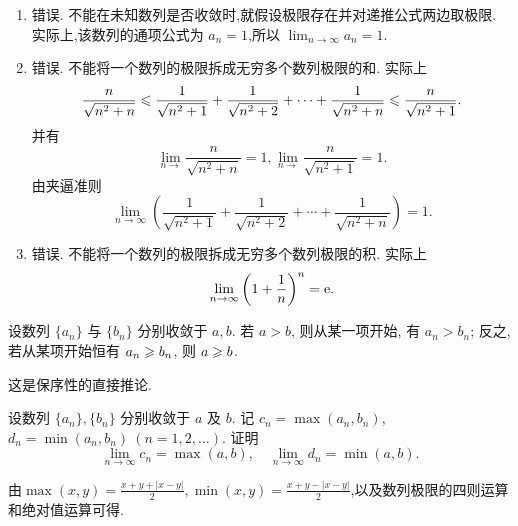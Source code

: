 \begin{solution}
    \begin{enumerate}
        \item 错误. 不能在未知数列是否收敛时,就假设极限存在并对递推公式两边取极限. 实际上,该数列的通项公式为 $a_n = 1$,所以 $\lim_{n\to\infty} a_n = 1$.
        \item 错误. 不能将一个数列的极限拆成无穷多个数列极限的和. 实际上
              $$
                  \frac{n}{\sqrt{n^2+n}}\leqslant \frac{1}{\sqrt{n^2+1}} + \frac{1}{\sqrt{n^2+2}} + \cdots + \frac{1}{\sqrt{n^2+n}}
                  \leqslant  \frac{n}{\sqrt{n^2+1}}.
              $$
              并有$$\lim_{n\to}\frac{n}{\sqrt{n^2+n}}=1,\lim_{n\to}\frac{n}{\sqrt{n^2+1}}=1.
              $$
              由夹逼准则$$
                  \lim_{n\to\infty} \left( \frac{1}{\sqrt{n^2+1}} + \frac{1}{\sqrt{n^2+2}} + \cdots + \frac{1}{\sqrt{n^2+n}} \right) = 1.
              $$
        \item 错误. 不能将一个数列的极限拆成无穷多个数列极限的积. 实际上
              $$
                  \lim_{n\to\infty} \left(1 + \frac{1}{n}\right)^n = \mathrm{e}.
              $$
    \end{enumerate}
\end{solution}

\begin{exercise}[1.2.13]
    设数列 $\{a_n\}$ 与 $\{b_n\}$ 分别收敛于 $a, b$. 若 $a > b$, 则从某一项开始, 有 $a_n > b_n$; 反之, 若从某项开始恒有 $a_n \geqslant b_n$, 则 $a \geqslant b$.
\end{exercise}

\begin{solution}
    这是保序性的直接推论.
\end{solution}

\begin{exercise}[1.2.14]
    设数列 $\{a_n\}, \{b_n\}$ 分别收敛于 $a$ 及 $b$. 记 $c_n = \max(a_n, b_n)$, $d_n = \min(a_n, b_n) \ (n=1, 2, \ldots)$. 证明
    $$
        \lim_{n\to\infty} c_n = \max(a, b), \quad \lim_{n\to\infty} d_n = \min(a, b).
    $$
\end{exercise}

\begin{solution}
    由$\max(x,y) = \frac{x+y+|x-y|}{2}, \min(x,y) = \frac{x+y-|x-y|}{2}$,以及数列极限的四则运算和绝对值运算可得.
\end{solution}

